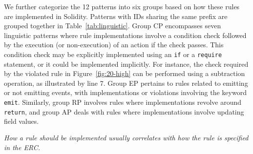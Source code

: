 



We further categorize the 12 patterns into six groups based on how these rules are implemented in Solidity. 
Patterns with IDs sharing the same prefix are grouped together in Table~\ref{tab:linguistic}. 
Group CP encompasses seven linguistic patterns where rule implementations involve a condition check 
followed by the execution (or non-execution) of an action 
if the check passes. 
This condition check may be explicitly implemented using an \texttt{if} or a \texttt{require} statement, or it could be implemented implicitly. 
For instance, the check required by the violated rule in Figure~\ref{fig:20-high} can be performed using a subtraction operation, as illustrated by line 7. 
Group EP pertains to rules related to emitting or not emitting events, with implementations or violations involving the keyword \texttt{emit}. Similarly, group RP involves rules where implementations revolve around \texttt{return}, and group AP deals with rules where implementations involve updating field values.

{\it{
How a rule should be implemented usually correlates with how the rule is specified in the ERC. 
}}
\fi
